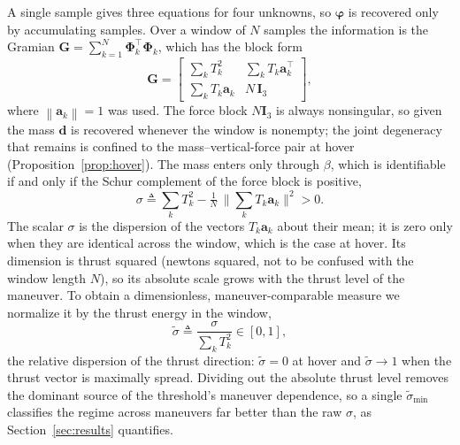 \documentclass{ieeeaccess}
\newcommand{\norm}[1]{\left\| #1 \right\|}
\newcommand{\vect}[1]{\bm{#1}}
\newcommand{\mat}[1]{\mathbf{#1}}
\begin{document}
A single sample gives three equations for four unknowns, so $\vect{\varphi}$ is
recovered only by accumulating samples. Over a window of $N$ samples the
information is the Gramian $\mat{G}=\sum_{k=1}^{N}\mat{\Phi}_k^{\!\top}\mat{\Phi}_k$,
which has the block form
\begin{equation}
\mat{G}=
\begin{bmatrix}
\sum_k T_k^2 & \sum_k T_k\vect{a}_k^{\!\top}\\[2pt]
\sum_k T_k\vect{a}_k & N\,\mat{I}_3
\end{bmatrix},
\label{eq:gramian}
\end{equation}
where $\norm{\vect{a}_k}=1$ was used. The force block $N\mat{I}_3$ is always
nonsingular, so given the mass $\vect{d}$ is recovered whenever the
window is nonempty; the joint degeneracy that remains is confined to the
mass--vertical-force pair at hover (Proposition~\ref{prop:hover}). The
mass enters only through $\beta$, which is identifiable if and only if the Schur
complement of the force block is positive,
\begin{equation}
\sigma \triangleq \sum_k T_k^2 - \tfrac{1}{N}\,\Big\|\textstyle\sum_k T_k\vect{a}_k\Big\|^2 > 0 .
\label{eq:schur}
\end{equation}
The scalar $\sigma$ is the dispersion of the vectors $T_k\vect{a}_k$ about their
mean; it is zero only when they are identical across the window, which is the
case at hover. Its dimension is thrust squared (newtons squared, not to be
confused with the window length $N$), so its
absolute scale grows with the thrust level of the maneuver. To obtain a
dimensionless, maneuver-comparable measure we normalize it by the thrust energy
in the window,
\begin{equation}
\tilde\sigma \triangleq \frac{\sigma}{\sum_k T_k^2}\in[0,1],
\label{eq:snorm}
\end{equation}
the relative dispersion of the thrust direction: $\tilde\sigma=0$ at hover and
$\tilde\sigma\!\to\!1$ when the thrust vector is maximally spread. Dividing out
the absolute thrust level removes the dominant source of the threshold's
maneuver dependence, so a single $\tilde\sigma_{\min}$ classifies the regime
across maneuvers far better than the raw $\sigma$, as Section~\ref{sec:results}
quantifies.
\end{document}
